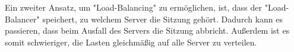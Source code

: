 Ein zweiter Ansatz, um "Load-Balancing" zu ermöglichen, ist, dass der "Load-Balancer" speichert, zu welchem Server die Sitzung gehört. Dadurch kann es passieren, dass beim Ausfall des Servers die Sitzung abbricht. Außerdem ist es somit schwieriger, die Lasten gleichmäßig auf alle Server zu verteilen.



\clearpage

